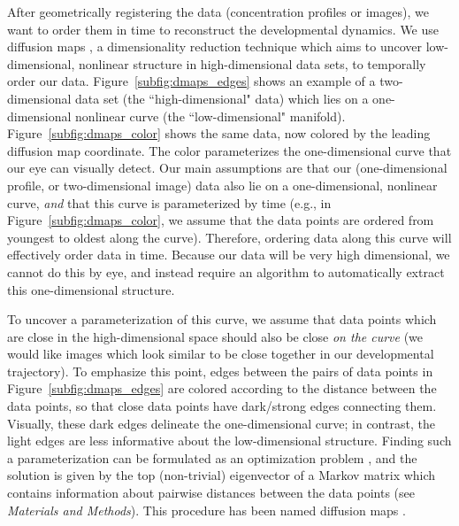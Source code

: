 \documentclass{pnastwo}
\begin{document}
\begin{article}
After geometrically registering the data (concentration profiles or images), we want to order them in time to reconstruct the developmental dynamics.
%
%
We use diffusion maps \cite{coifman2005geometric}, a dimensionality reduction technique which aims to uncover low-dimensional, nonlinear structure in high-dimensional data sets, to temporally order our data.
%
Figure~\ref{subfig:dmaps_edges} shows an example of a two-dimensional data set (the ``high-dimensional" data) which lies on a one-dimensional nonlinear curve (the ``low-dimensional" manifold).
%
Figure~\ref{subfig:dmaps_color} shows the same data, now colored by the leading diffusion map coordinate.
%
The color parameterizes the one-dimensional curve that our eye can visually detect.
%
Our main assumptions are that our (one-dimensional profile, or two-dimensional image) data also lie on a one-dimensional, nonlinear curve, {\em and} that this curve is parameterized by time (e.g., in Figure~\ref{subfig:dmaps_color}, we assume that the data points are ordered from youngest to oldest along the curve).
%
Therefore, ordering data along this curve will effectively order data in time.
%
Because our data will be very high dimensional, we cannot do this by eye, and instead require an algorithm to automatically extract this one-dimensional structure.

To uncover a parameterization of this curve, we assume that data points which are close in the high-dimensional space should also be close {\em on the curve} (we would like images which look similar to be close together in our developmental trajectory).
%
%
To emphasize this point, edges between the pairs of data points in Figure~\ref{subfig:dmaps_edges} are colored according to the distance between the data points, so that close data points have dark/strong
edges connecting them.
%
Visually, these dark edges delineate the one-dimensional curve; in contrast, the light edges are less informative
about the low-dimensional structure.
%
%
Finding such a parameterization can be formulated as an optimization problem \cite{Belkin2003}, and the solution is given by the top (non-trivial) eigenvector of a Markov matrix which contains information about pairwise distances between the data points (see {\it Materials and Methods}).
%
This procedure has been named diffusion maps \cite{coifman2005geometric}.
%


\end{article}
\end{document}
